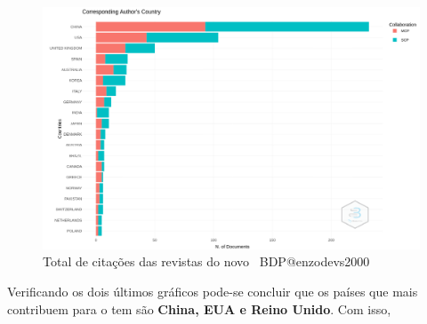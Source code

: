 \begin{figure}[H]
    \centering
    \includegraphics[width=1\textwidth]{experiments/enzodevs2000/AnaliseBibliometrica/BigDataInPolicy/Figures/Graficos/NovoDataset/Authors/authorsCountries.png}
    \caption{Total de citações das revistas do novo 
    \dataset\ BDP@enzodevs2000}
    \label{fig:enzodevs2000:BDP:newdataset:authors:authors_countries}
\end{figure}

Verificando os dois últimos gráficos pode-se concluir que os países que mais contribuem para o tem são \textbf{China, EUA e Reino Unido}. Com isso, 